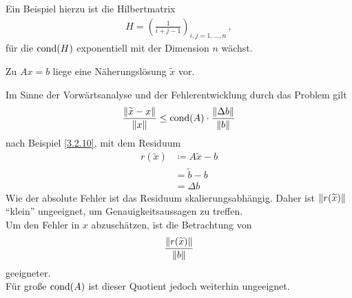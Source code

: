 Ein Beispiel hierzu ist die Hilbertmatrix
\begin{gather*}
  H  =  \left( \frac{1}{i + j -1 } \right)_{i,j= 1,\ldots, n}\, ,
\end{gather*}
für die $\Cond ( H)$ exponentiell mit der Dimension $n$ wächst.


Zu $Ax=b$ liege eine Näherungslösung $\widetilde{x}$ vor.


Im Sinne der Vorwärtsanalyse und der Fehlerentwicklung durch das Problem gilt
\begin{gather*}
  \frac{\nn[\widetilde{x}-x]}{\nn[x]} \leq \Cond(A) \cdot \frac{\nn[\Delta b]}{\nn[b]}
\end{gather*}
nach Beispiel \ref{3.2.10}, 
mit dem Residuum 
\begin{align}
  r(\widetilde{x})  & \coloneqq A\widetilde{x} - b \label{III.4.1} \\ \nonumber 
                    &	= \widetilde{b}-b \\ \nonumber
                    & = \Delta b
\end{align}
Wie der absolute Fehler ist das Residuum skalierungsabhängig.
Daher ist $\nn[r(\widetilde{x})]$ \enquote{klein} ungeeignet, um
Genauigkeitsaussagen zu treffen. \\
Um den Fehler in $x$ abzuschätzen, ist die Betrachtung von 
\begin{gather}
  \frac{\nn[r(\widetilde{x})]}{\nn[b]} \label{III.4.2}
\end{gather}
geeigneter. \\
Für große $\Cond(A)$ ist dieser Quotient jedoch weiterhin ungeeignet.

